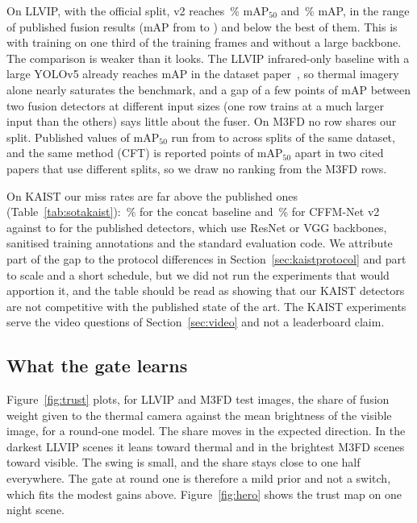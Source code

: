 


On LLVIP, with the official split, v2 reaches \resLlvipCffmVtwoMeanMapFifty{}\,\% mAP$_{50}$ and \resLlvipCffmVtwoMeanMap{}\,\% mAP, in the range of published fusion results (mAP from \sotaLlvipFusionMapMin{} to \sotaLlvipFusionMapMax{}) and below the best of them. This is with training on one third of the training frames and without a large backbone. The comparison is weaker than it looks. The LLVIP infrared-only baseline with a large YOLOv5 already reaches \sotaLlvipIrOnlyMap{} mAP in the dataset paper~\cite{jia2021llvip}, so thermal imagery alone nearly saturates the benchmark, and a gap of a few points of mAP between two fusion detectors at different input sizes (one row trains at a much larger input than the others) says little about the fuser. On M3FD no row shares our split. Published values of mAP$_{50}$ run from \sotaMfdMapFiftyMin{} to \sotaMfdMapFiftyMax{} across splits of the same dataset, and the same method (CFT) is reported \sotaMfdSplitSwing{} points of mAP$_{50}$ apart in two cited papers that use different splits, so we draw no ranking from the M3FD rows.

On KAIST our miss rates are far above the published ones (Table~\ref{tab:sotakaist}): \kstConcatAllMr{}\,\% for the concat baseline and \kstCffmAllMr{}\,\% for CFFM-Net v2 against \sotaKaistMrMin{} to \sotaKaistMrMax{} for the published detectors, which use ResNet or VGG backbones, sanitised training annotations and the standard evaluation code. We attribute part of the gap to the protocol differences in Section~\ref{sec:kaistprotocol} and part to scale and a short schedule, but we did not run the experiments that would apportion it, and the table should be read as showing that our KAIST detectors are not competitive with the published state of the art. The KAIST experiments serve the video questions of Section~\ref{sec:video} and not a leaderboard claim.

\subsection{What the gate learns}
\label{sec:gate}
Figure~\ref{fig:trust} plots, for LLVIP and M3FD test images, the share of fusion weight given to the thermal camera against the mean brightness of the visible image, for a round-one model. The share moves in the expected direction. In the darkest LLVIP scenes it leans toward thermal and in the brightest M3FD scenes toward visible. The swing is small, and the share stays close to one half everywhere. The gate at round one is therefore a mild prior and not a switch, which fits the modest gains above. Figure~\ref{fig:hero} shows the trust map on one night scene.


